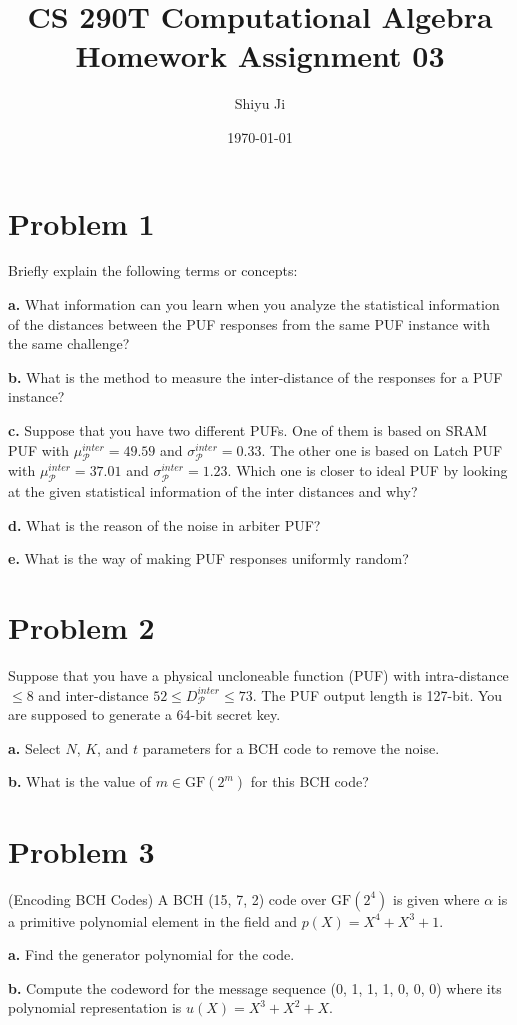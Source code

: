 \documentclass[12pt]{article}
\theoremstyle{plain}
\begin{document}
\title{CS 290T Computational Algebra Homework Assignment 03}
\author{Shiyu Ji}
\date{\today}
\maketitle

\newcommand{\m}[1]{\begin{bmatrix}#1\end{bmatrix}}
\newcommand{\rank}[1]{\operatorname{rank}(#1)}
\newcommand{\F}{\mathbb{F}}

\section{Problem 1}
Briefly explain the following terms or concepts:

{\bf a.} What information can you learn when you analyze the statistical
information of the distances between the PUF responses from the
same PUF instance with the same challenge?

{\bf b.} What is the method to measure the inter-distance of the responses
for a PUF instance?

\newcommand{\p}{\mathcal{P}}
{\bf c.} Suppose that you have two different PUFs. One of them is based
on SRAM PUF with $\mu_{\p}^{inter} = 49.59$ and $\sigma_{\p}^{inter} = 0.33$. The other one is based on Latch PUF with $\mu_{\p}^{inter} = 37.01$ and $\sigma_{\p}^{inter} = 1.23$. Which one is closer to ideal PUF by looking at the given statistical
information of the inter distances and why?

{\bf d.} What is the reason of the noise in arbiter PUF?

{\bf e.} What is the way of making PUF responses uniformly random?

\section{Problem 2}
Suppose that you have a physical uncloneable function (PUF) with
intra-distance $\leq 8$ and inter-distance $52 \leq D_{\p}^{inter} \leq 73$. The PUF
output length is 127-bit. You are supposed to generate a 64-bit secret
key.

{\bf a.} Select $N$, $K$, and $t$ parameters for a BCH code to remove the noise.


\newcommand{\GF}{\textrm{GF}}
{\bf b.} What is the value of $m \in \GF(2^m)$ for this BCH code?


\section{Problem 3}

(Encoding BCH Codes) A BCH (15, 7, 2) code over $\GF(2^4)$ is given where $\alpha$ is a primitive polynomial element in the field and $p(X) = X^4 + X^3 + 1$.

{\bf a.} Find the generator polynomial for the code.

{\bf b.} Compute the codeword for the message sequence (0, 1, 1, 1, 0, 0, 0)
where its polynomial representation is $u(X) = X^3 + X^2 + X$.
\end{document}
